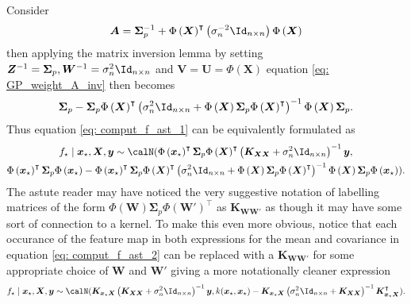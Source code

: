 Consider
\begin{equation} \label{eq: GP_weight_A_inv}
    \bm{A} = \bm{\Sigma}_p^{-1} +  {\Phi \left( \bm{X} \right)}^{\intercal} \left( \sigma_n^{-2} \Id_{n \times n} \right) \Phi \left( \bm{X} \right)
\end{equation}
then applying the matrix inversion lemma by setting $\bm{Z}^{-1} = \bm{\Sigma}_p, \bm{W}^{-1} = \sigma_n^{2} \Id_{n \times n}$ and $\bm{V} = \bm{U} = \Phi \left( \bm{X} \right)$ equation \ref{eq: GP_weight_A_inv} then becomes
\begin{equation*}
    \bm{\Sigma}_p - \bm{\Sigma}_p {\Phi \left( \bm{X} \right)}^{\intercal} \left( \sigma_n^{2} \Id_{n \times n} + \Phi \left( \bm{X} \right) \bm{\Sigma}_p {\Phi \left( \bm{X} \right)}^{\intercal} \right)^{-1} \Phi \left( \bm{X} \right) \bm{\Sigma}_p.
\end{equation*}
Thus equation \ref{eq: comput_f_ast_1} can be equivalently formulated as
\begin{multline} \label{eq: comput_f_ast_2}
    f_{\star} \mid \bm{x}_{\star} , \bm{X} , \bm{y} \sim \calN ( \Phi \left( \bm{x}_{\star} \right)^{\intercal} \bm{\Sigma}_p {\Phi \left( \bm{X} \right)}^{\intercal} \left( \bm{K}_{\bm{X} \bm{X}} + \sigma_n^{2} \Id_{n \times n} \right)^{-1} \bm{y} , \\
    \Phi \left( \bm{x}_{\star} \right)^{\intercal} \bm{\Sigma}_p \Phi \left( \bm{x}_{\star} \right) - \Phi \left( \bm{x}_{\star} \right)^{\intercal} \bm{\Sigma}_p {\Phi \left( \bm{X} \right)}^{\intercal} \left( \sigma_n^{2} \Id_{n \times n} + \Phi \left( \bm{X} \right) \bm{\Sigma}_p {\Phi \left( \bm{X} \right)}^{\intercal} \right)^{-1} \Phi \left( \bm{X} \right) \bm{\Sigma}_p \Phi \left( \bm{x}_{\star} \right) ).
\end{multline}
The astute reader may have noticed the very suggestive notation of labelling matrices of the form $\Phi \left( \bm{W} \right) \bm{\Sigma}_p {\Phi \left( \bm{W}' \right)}^{\intercal}$ as $\bm{K}_{\bm{W} \bm{W}'}$ as though it may have some sort of connection to a kernel. To make this even more obvious, notice that each occurance of the feature map in both expressions for the mean and covariance in equation \ref{eq: comput_f_ast_2} can be replaced with a $\bm{K}_{\bm{W} \bm{W}'}$ for some appropriate choice of $\bm{W}$ and $\bm{W}'$ giving a more notationally cleaner expression
\begin{equation} \label{eq: comput_f_ast_3}
    f_{\star} \mid \bm{x}_{\star} , \bm{X} , \bm{y} \sim \calN ( \bm{K}_{\bm{x}_{\star} \bm{X}} \left( \bm{K}_{\bm{X} \bm{X}} + \sigma_n^{2} \Id_{n \times n} \right)^{-1} \bm{y} , k (\bm{x}_{\star}, \bm{x}_{\star}) - \bm{K}_{\bm{x}_{\star} \bm{X}} \left( \sigma_n^{2} \Id_{n \times n} + \bm{K}_{\bm{X} \bm{X}} \right)^{-1} \bm{K}_{\bm{x}_{\star} \bm{X}}^{\intercal}).
\end{equation}
